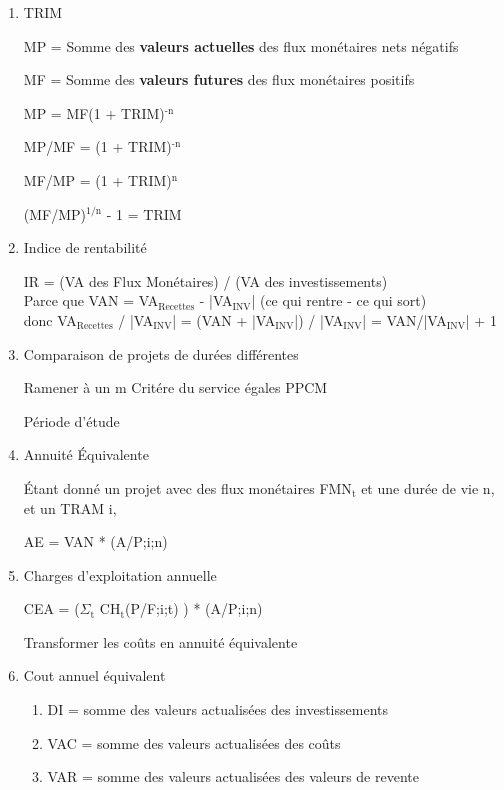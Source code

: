 \documentclass[11pt]{article}
\begin{document}
\begin{enumerate}
\item TRIM
\label{sec:orgaa4841b}

MP = Somme des \textbf{valeurs actuelles} des flux monétaires nets négatifs

MF = Somme des \textbf{valeurs futures} des flux monétaires positifs

MP = MF(1 + TRIM)\(^{\text{-n}}\)

MP/MF = (1 + TRIM)\(^{\text{-n}}\)

MF/MP = (1 + TRIM)\(^{\text{n}}\)

(MF/MP)\(^{\text{1/n}}\) - 1 = TRIM

\item Indice de rentabilité
\label{sec:orge903fc0}

IR = (VA des Flux Monétaires) / (VA des investissements) \\
Parce que VAN = VA\(_{\text{Recettes}}\) - |VA\(_{\text{INV}}\)| (ce qui rentre - ce qui sort) \\
donc VA\(_{\text{Recettes}}\) / |VA\(_{\text{INV}}\)| = (VAN + |VA\(_{\text{INV}}\)|) / |VA\(_{\text{INV}}\)| = VAN/|VA\(_{\text{INV}}\)| + 1 \\
\item Comparaison de projets de durées différentes
\label{sec:org5b6c57c}

Ramener à un m
Critére du service égales
PPCM

Période d'étude

\item Annuité Équivalente
\label{sec:orgf621e81}

Étant donné un projet avec des flux monétaires FMN\(_{\text{t}}\) et une durée de vie n, et un
TRAM i,

AE = VAN * (A/P;i;n)

\item Charges d'exploitation annuelle
\label{sec:org7a08d36}

CEA = (\(\Sigma_{\text{t}}\) CH\(_{\text{t}}\)(P/F;i;t) ) * (A/P;i;n)

Transformer les coûts en annuité équivalente

\item Cout annuel équivalent
\label{sec:orgcc7bc53}

\begin{enumerate}
\item DI = somme des valeurs actualisées des investissements \\
\item VAC = somme des valeurs actualisées des coûts \\
\item VAR = somme des valeurs actualisées des valeurs de revente \\
\end{enumerate}


\end{enumerate}
\end{document}
